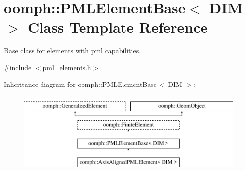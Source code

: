\hypertarget{classoomph_1_1PMLElementBase}{}\section{oomph\+:\+:P\+M\+L\+Element\+Base$<$ D\+IM $>$ Class Template Reference}
\label{classoomph_1_1PMLElementBase}


Base class for elements with pml capabilities.  




{\ttfamily \#include $<$pml\+\_\+elements.\+h$>$}

Inheritance diagram for oomph\+:\+:P\+M\+L\+Element\+Base$<$ D\+IM $>$\+:\begin{figure}[H]
\begin{center}
\leavevmode
\includegraphics[height=4.000000cm]{classoomph_1_1PMLElementBase}
\end{center}
\end{figure}
